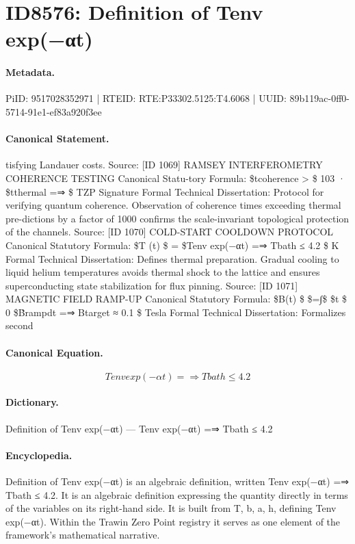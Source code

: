 \section*{ID8576: Definition of Tenv exp(−αt)}
\paragraph{Metadata.}
PiID: 9517028352971 | RTEID: RTE:P33302.5125:T4.6068 | UUID: 89b119ac-0ff0-5714-91e1-ef83a920f3ee

\paragraph{Canonical Statement.}
tisfying Landauer costs. Source: [ID 1069] RAMSEY INTERFEROMETRY COHERENCE TESTING Canonical Statu-tory Formula: \$tcoherence > \$ 103 · \$tthermal =⇒ \$ TZP Signature Formal Technical Dissertation: Protocol for verifying quantum coherence. Observation of coherence times exceeding thermal pre-dictions by a factor of 1000 confirms the scale-invariant topological protection of the channels. Source: [ID 1070] COLD-START COOLDOWN PROTOCOL Canonical Statutory Formula: \$T (t) \$ = \$Tenv exp(−αt) =⇒ Tbath ≤ 4.2 \$ K Formal Technical Dissertation: Defines thermal preparation. Gradual cooling to liquid helium temperatures avoids thermal shock to the lattice and ensures superconducting state stabilization for flux pinning. Source: [ID 1071] MAGNETIC FIELD RAMP-UP Canonical Statutory Formula: \$B(t) \$ \$=∫\$ \$t \$ 0 \$Ḃrampdt =⇒ Btarget ≈ 0.1 \$ Tesla Formal Technical Dissertation: Formalizes second

\paragraph{Canonical Equation.}
\[
Tenv exp(−αt) =⇒ Tbath ≤ 4.2
\]

\paragraph{Dictionary.}
Definition of Tenv exp(−αt) — Tenv exp(−αt) =⇒ Tbath ≤ 4.2

\paragraph{Encyclopedia.}
Definition of Tenv exp(−αt) is an algebraic definition, written Tenv exp(−αt) =⇒ Tbath ≤ 4.2. It is an algebraic definition expressing the quantity directly in terms of the variables on its right-hand side. It is built from T, b, a, h, defining Tenv exp(−αt). Within the Trawin Zero Point registry it serves as one element of the framework's mathematical narrative.
